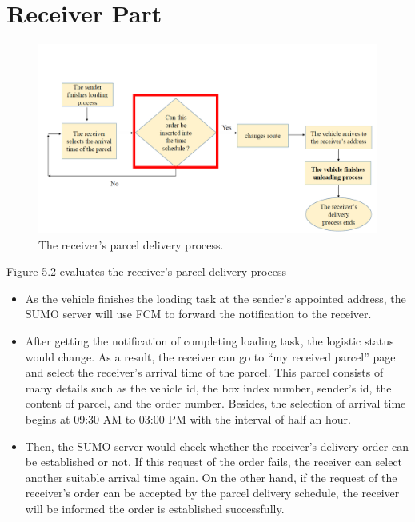 \documentclass[12pt]{ksthesis}
\begin{document}
\begin{thesis}
{\begin{itemize}
\end{itemize}

\section{Receiver Part}

\begin{figure}[H]
\centering
\includegraphics[width=1.14\textwidth]{./Thesis_figures/F5-2_receiver_delivery_process.PNG}
\caption{\large The receiver's parcel delivery process.}
\vspace{0.5cm}
\label{Fig:receiver_process}
\end{figure}

Figure 5.2 evaluates the receiver’s parcel delivery process

\begin{itemize}
\item
As the vehicle finishes the loading task at the sender’s appointed address, the SUMO server will use FCM to forward the notification to the receiver.

\item
After getting the notification of completing loading task, the logistic status would change. As a result, the receiver can go to “my received parcel” page and select the receiver’s arrival time of the parcel. This parcel consists of many details such as the vehicle id, the box index number, sender’s id, the content of parcel, and the order number. Besides, the selection of arrival time begins at 09:30 AM to 03:00 PM with the interval of half an hour.

\item
Then, the SUMO server would check whether the receiver’s delivery order can be established or not. If this request of the order fails, the receiver can select another suitable arrival time again. On the other hand, if the request of the receiver’s order can be accepted by the parcel delivery schedule, the receiver will be informed the order is established successfully.


\end{itemize}}
\end{thesis}
\end{document}
